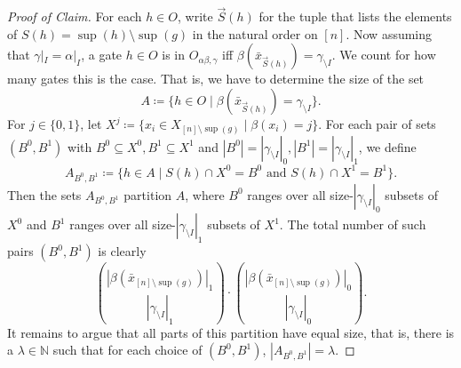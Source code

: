 \documentclass[11pt]{article}
\DeclareMathOperator{\supp}{sup}
\newcommand{\bbN}{\mathbb{N}}
\theoremstyle{definition}
\theoremstyle{plain}
\theoremstyle{remark}
\newenvironment{claimproof}[1][Proof of Claim]{\begin{proof}[#1] \renewcommand{\qedsymbol}{$\lrcorner$}}{ \end{proof}}
\theoremstyle{remark}
\begin{document}
\begin{claimproof}
	For each $h \in O$, write $\vec{S}(h)$ for the tuple that lists the elements of $S(h) = \supp(h) \setminus \supp(g)$ in the natural order on $[n]$.
	Now assuming that $\gamma|_I = \alpha|_I$, a gate $h \in O$ is in $O_{\alpha\beta, \gamma}$ iff $\beta(\bar{x}_{\vec{S}(h)}) = \gamma_{\setminus I}$. We count for how many gates this is the case. That is, we have to determine the size of the set
	\[
	A \coloneqq \{ h \in O \mid \beta(\bar{x}_{\vec{S}(h)}) = \gamma_{\setminus I}   \}.
	\]
	For $j \in \{0,1\}$, let $X^j  \coloneqq \{ x_i \in X_{[n]\setminus \supp(g)} \mid \beta(x_i) = j\}$.
	For each pair of sets $(B^0, B^1)$ with $B^0 \subseteq X^0, B^1 \subseteq X^1$ and $|B^0| = |\gamma_{\setminus I}|_0, |B^1| = |\gamma_{\setminus I}|_1$, we define
	\[
	A_{B^0, B^1} \coloneqq \{ h \in A \mid S(h) \cap X^0 = B^0 \text{ and }  S(h) \cap X^1 = B^1    \}.
	\]
	Then the sets $A_{B^0,B^1}$ partition $A$, where $B^0$ ranges over all size-$|\gamma_{\setminus I}|_0$ subsets of $X^0$ and $B^1$ ranges over all size-$|\gamma_{\setminus I}|_1$ subsets of $X^1$. 
	The total number of such pairs $(B^0, B^1)$ is clearly 
	\[
	\binom{|\beta(\bar{x}_{[n] \setminus \supp(g)})|_1 }{|\gamma_{\setminus I}|_1} \cdot \binom{|\beta(\bar{x}_{[n] \setminus \supp(g)})|_0 }{|\gamma_{\setminus I}|_0}.
	\]
	It remains to argue that all parts of this partition have equal size, that is, there is a $\lambda \in \bbN$ such that for each choice of $(B^0, B^1)$, $|A_{B^0, B^1}| = \lambda$.
	

\end{claimproof}
\end{document}

